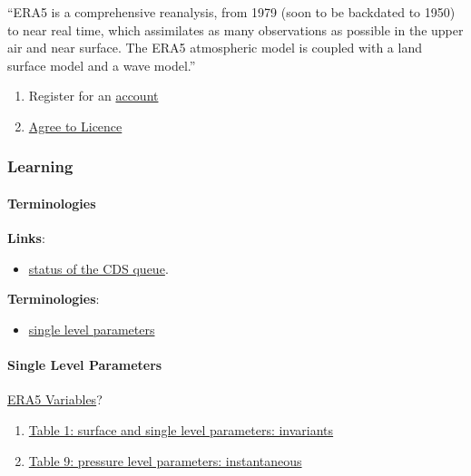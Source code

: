 \documentclass[
]{book}
\providecommand{\tightlist}{%
  \setlength{\itemsep}{0pt}\setlength{\parskip}{0pt}}
\begin{document}
``ERA5 is a comprehensive reanalysis, from 1979 (soon to be backdated to 1950) to near real time, which assimilates as many observations as possible in the upper air and near surface. The ERA5 atmospheric model is coupled with a land surface model and a wave model.''

\begin{enumerate}
\def\labelenumi{\arabic{enumi}.}
\tightlist
\item
  Register for an \href{cds.climate.copernicus.eu}{account}
\item
  \href{https://cds.climate.copernicus.eu/cdsapp/\#!/terms/licence-to-use-copernicus-products}{Agree to Licence}
\end{enumerate}

\hypertarget{learning}{%
\subsubsection{Learning}\label{learning}}

\hypertarget{terminologies}{%
\paragraph{Terminologies}\label{terminologies}}

\textbf{Links}:

\begin{itemize}
\tightlist
\item
  \href{https://cds.climate.copernicus.eu/live/queue}{status of the CDS queue}.
\end{itemize}

\textbf{Terminologies}:

\begin{itemize}
\tightlist
\item
  \href{}{single level parameters}
\end{itemize}

\hypertarget{single-level-parameters}{%
\paragraph{Single Level Parameters}\label{single-level-parameters}}

\href{https://confluence.ecmwf.int/display/CKB/ERA5?src=breadcrumbs-parent}{ERA5 Variables}?

\begin{enumerate}
\def\labelenumi{\arabic{enumi}.}
\tightlist
\item
  \href{https://confluence.ecmwf.int/pages/viewpage.action?pageId=82870405\#ERA5:datadocumentation-Table1}{Table 1: surface and single level parameters: invariants}
\item
  \href{https://confluence.ecmwf.int/pages/viewpage.action?pageId=82870405\#ERA5:datadocumentation-Table9}{Table 9: pressure level parameters: instantaneous}
\end{enumerate}
\end{document}
